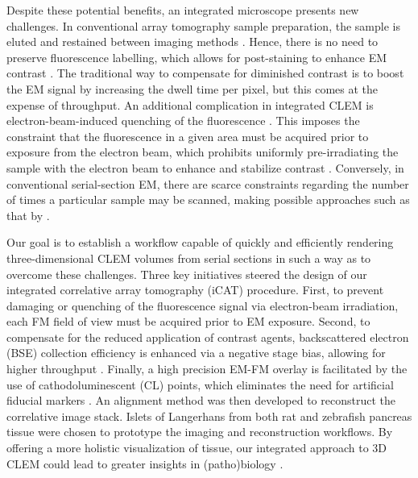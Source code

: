 Despite these potential benefits, an integrated microscope presents new challenges. In conventional array tomography sample preparation, the sample is eluted and restained between imaging methods \cite{micheva2007array}. Hence, there is no need to preserve fluorescence labelling, which allows for post-staining to enhance EM contrast \cite{watson1958staining, tapia2012high}. The traditional way to compensate for diminished contrast is to boost the EM signal by increasing the dwell time per pixel, but this comes at the expense of throughput. An additional complication in integrated CLEM is electron-beam-induced quenching of the fluorescence \cite{srinivasa2021electron}. This imposes the constraint that the fluorescence in a given area must be acquired prior to exposure from the electron beam, which prohibits uniformly pre-irradiating the sample with the electron beam to enhance and stabilize contrast \cite{kuipers2015scanning}. Conversely, in conventional serial-section EM, there are scarce constraints regarding the number of times a particular sample may be scanned, making possible approaches such as that by \textcite{hildebrand2017whole}.

Our goal is to establish a workflow capable of quickly and efficiently rendering three-dimensional CLEM volumes from serial sections in such a way as to overcome these challenges. Three key initiatives steered the design of our integrated correlative array tomography (iCAT) procedure. First, to prevent damaging or quenching of the fluorescence signal via electron-beam irradiation, each FM field of view must be acquired prior to EM exposure. Second, to compensate for the reduced application of contrast agents, backscattered electron (BSE) collection efficiency is enhanced via a negative stage bias, allowing for higher throughput \cite{bouwer2016deceleration, lane2021optimization}. Finally, a high precision EM-FM overlay is facilitated by the use of cathodoluminescent (CL) points, which eliminates the need for artificial fiducial markers \cite{haring2017automated}. An alignment method was then developed to reconstruct the correlative image stack. Islets of Langerhans from both rat and zebrafish pancreas tissue were chosen to prototype the imaging and reconstruction workflows. By offering a more holistic visualization of tissue, our integrated approach to 3D CLEM could lead to greater insights in (patho)biology \cite{de2020large}.
